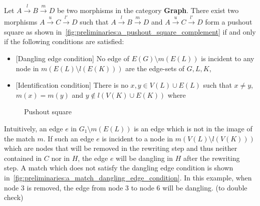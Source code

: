 \begin{proposition}
    Let $A \overset{l}{\rightarrow} B \overset{m}{\rightarrow} D$ be two morphisms in the category \textbf{Graph}. There exist two morphisms $A \overset{u}{\rightarrow} C \overset{l'}{\rightarrow} D$ such that $A \overset{l}{\rightarrow} B \overset{m}{\rightarrow} D$ and $A \overset{u}{\rightarrow} C \overset{l'}{\rightarrow} D$ form a pushout square as shown in~\autoref{fig:preliminaries:a_pushout_square_complement} if and only if the following conditions are satisfied:
    \begin{itemize}
        \item{[Dangling edge condition]} No edge of $E(G) \setminus m(E(L))$ is incident to any node in $m(E(L) \setminus l(E(K)))$ are the edge-sets of $G,L,K$,
        \item{[Identification condition]} There is no $x,y \in V(L) \cup E(L)$ such that $x \not = y$, $m(x) = m(y)$ and $y \notin l(V(K) \cup E(K))$ where 
    \end{itemize} 
    \begin{figure}[!ht]
        \centering
        \caption{Pushout square}
        \label{fig:preliminaries:a_pushout_square_complement}
    \end{figure}
\end{proposition}
Intuitively, an edge $e$ in $G_1 \setminus m(E(L))$ is an edge which is not in the image of the match $m$. If such an edge $e$ is incident to a node in $m(V(L) \setminus l(V(K)))$ which are nodes that will be removed in the rewriting step and thus neither contained in $C$ nor in $H$, the edge $e$ will be dangling in $H$ after the rewriting step. A match which does not satisfy the dangling edge condition is shown in~\autoref{fig:preliminaries:a_match_dangling_edge_condition}. In this example, when node 3 is removed, the edge from node 3 to node 6 will be dangling. (to double check)
